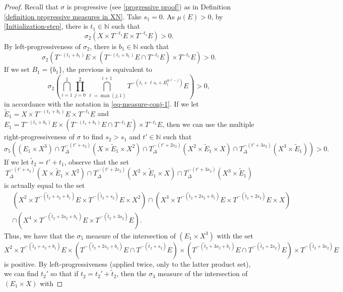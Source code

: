 \documentclass[letter, 11pt]{article}
\theoremstyle{definition}
\theoremstyle{plain}
\newcommand{\N}{\mathbb{N}}
\newcommand{\1}{\mathbbm{1}}
\begin{document}
\begin{proof}
 Recall that $\sigma$ is progressive (see \cref{progressive proof}) as in Definition \ref{definition progressive measures in XN}. Take $s_1=0$. As $\mu(E)>0$, by \cref{Initialization-step}, there is $t_1\in \N$ such that 
    $$\sigma_2(X \times T^{-t_1}E \times T^{-t_1 }E) >0. $$
    By left-progressiveness of $\sigma_2$, there is $b_1\in \N$ such that 
    \begin{equation*}
     \sigma_2(T^{-(t_1+b_1)}E \times (T^{-(t_1
    +b_1)}E \cap T^{-t_1 }E) \times T^{-t_1 }E )>0. 
    \end{equation*}  
    If we set $B_1=\{b_1\}$, the previous is equivalent to 
    $$\sigma_{2}\left(\bigcap_{i=1}^1  \prod_{j=0}^{2}  \bigcap_{\ell=\max(j,1)}^{i+1}  T^{-\left( t_i+\ell s_i+ B_1^{\oplus \ell-j} \right)}  E   \right)>0, $$
    in accordance with the notation in \eqref{eq-measure-conj-1}.
    If we let $\tilde{E}_1=X \times T^{-(t_1+b_1)}E \times T^{-t_1 }E$ and $E_1=T^{-(t_1+b_1)}E \times (T^{-(t_1+b_1)}E \cap T^{-t_1 }E) \times T^{-t_1 }E$, then we can use the multiple right-progressiveness of $\sigma$ to find $s_2>s_1$ and $t'\in \N$ such that 
    $$\sigma_{5}((E_1\times X^3) \cap T_\Delta^{-(t'+s_2)} (X\times \tilde{E}_1\times X^2)\cap T_\Delta^{-(t'+2s_2)} (X^2\times \tilde{E}_1\times X)\cap T_\Delta^{-(t'+3s_2)} (X^3\times \tilde{E}_1 ) )>0. $$
    If we let $\tilde{t}_2=t'+t_1$, 
    observe that the set 
    $$ T_\Delta^{-(t'+s_2)} (X\times \tilde{E}_1\times X^2)\cap T_\Delta^{-(t'+2s_2)} (X^2\times \tilde{E}_1\times X)\cap T_\Delta^{-(t'+3s_2)} (X^3\times \tilde{E}_1 )$$
    is actually equal to the set
    \begin{align*}
      &(X^2 \times T^{-(\tilde{t}_2+s_2+b_1)}E \times T^{-(\tilde{t}_2+s_2)} E \times X^2)\cap (X^3 \times T^{-(\tilde{t}_2+2s_2+b_1)}E \times  T^{-(\tilde{t}_2+2s_2)} E\times X)\\& \cap (X^4 \times T^{-(\tilde{t}_2+3s_2+b_1)}E \times T^{-(\tilde{t}_2+3s_2)}E).  
    \end{align*}
    Thus, we have that the $\sigma_5$ measure of the intersection of $(E_1\times X^3)$ with the set
    $$  X^2 \times T^{-(\tilde{t}_2+s_2+b_1)}E \times (T^{-(\tilde{t}_2+2s_2+b_1)} E\cap T^{-(\tilde{t}_2+s_2)}E) \times  (T^{-(\tilde{t}_2+3s_2+b_1)} E\cap T^{-(\tilde{t}_2+2s_2)}E) \times T^{-(\tilde{t}_2+3s_2)}E$$
    is positive. By left-progressiveness (applied twice, only to the latter product set), we can find $t_2'$ so that if $t_2=t_2'+\tilde{t}_2$, then the $\sigma_3$ measure of the intersection of $(E_1\times X)$ with

\end{proof}
\end{document}
